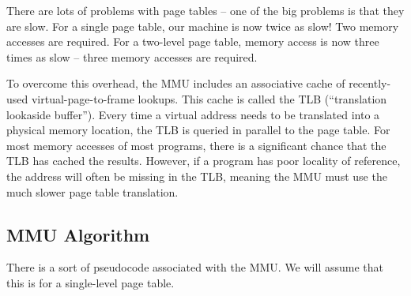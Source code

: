 There are lots of problems with page tables -- one of the big problems is that they are slow.
For a single page table, our machine is now twice as slow!
Two memory accesses are required.
For a two-level page table, memory access is now three times as slow -- three memory accesses are required.
	 
To overcome this overhead, the MMU includes an associative cache of recently-used virtual-page-to-frame lookups.
This cache is called the TLB (``translation lookaside buffer'').
Every time a virtual address needs to be translated into a physical memory location, the TLB is queried in parallel to the page table.
For most memory accesses of most programs, there is a significant chance that the TLB has cached the results.
However, if a program has poor locality of reference, the address will often be missing in the TLB, meaning the MMU must use the much slower page table translation.
	 
\subsection{MMU Algorithm}
	 
There is a sort of pseudocode associated with the MMU.
We will assume that this is for a single-level page table.
	 
